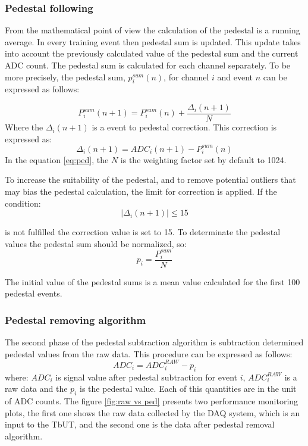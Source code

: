 \subsubsection{Pedestal following}
From the mathematical point of view the calculation of the pedestal is a running average. In every training event then pedestal sum is updated. This update takes into account the previously calculated value of the pedestal sum and the current ADC count. The pedestal sum is calculated for each channel separately. To be more precisely, the pedestal sum, $p^{sum}_i(n)$, for channel $i$ and event $n$ can be expressed as follows:

\begin{equation}
P_{i}^{sum}(n+1)=P^{sum}_{i}(n) + \frac{\Delta_{i}(n+1)}{N}
\label{eq:ped}
\end{equation}
Where the $\Delta_{i}(n+1)$ is a event to pedestal correction. This correction is expressed as:
\begin{equation}
\Delta_{i}(n+1)=ADC_{i}(n+1)-P^{sum}_{i}(n)
\end{equation}
In the equation \ref{eq:ped}, the $N$ is the weighting factor set by default to 1024. 


To increase the suitability of the pedestal, and to remove potential outliers that may bias the pedestal calculation, the limit for correction is applied. If the condition:
\begin{equation} 
\left| \Delta_{i}(n+1) \right| \leq 15  
\end{equation}

is not fulfilled the correction value is set to 15. To determinate the pedestal values the pedestal sum should be normalized, so:
\begin{equation}
p_{i}=\frac{P^{sum}_{i}}{N}
\end{equation}

The initial value of the pedestal sums is a mean value calculated for the first 100 pedestal events. 

\subsubsection{Pedestal removing algorithm}
The second phase of the pedestal subtraction algorithm is subtraction determined pedestal values from the raw data. This procedure can be expressed as follows:
\begin{equation}
ADC_{i}=ADC^{RAW}_{i}-p_{i}
\end{equation} 
where: $ADC_{i}$ is signal value after pedestal subtraction for event $i$, $ADC^{RAW}_{i}$ is a raw data and the $p_{i}$ is the pedestal value. Each of this quantities are in the unit of ADC counts. 
The figure \ref{fig:raw vs ped} presents two performance monitoring plots, the first one shows the raw data collected by the DAQ system, which is an input to the TbUT, and the second one is the data after pedestal removal algorithm.  


